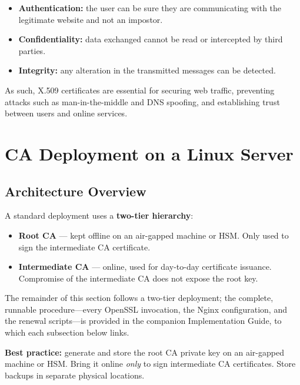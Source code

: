 \documentclass[10pt,twocolumn]{article}
\newcommand{\IGbase}{https://github.com/willLeckyThom/NetworkSecurity/blob/main/Projet/certificate_chain.md}
\newif\ifIGhref
\newcommand{\IGdoc}[1]{\ifIGhref\href{\IGbase}{#1}\else#1\fi}%
\begin{document}
\begin{itemize}
  \item \textbf{Authentication:} the user can be sure they are communicating
        with the legitimate website and not an impostor.
  \item \textbf{Confidentiality:} data exchanged cannot be read or intercepted
        by third parties.
  \item \textbf{Integrity:} any alteration in the transmitted messages can be
        detected.
\end{itemize}

As such, X.509 certificates are essential for securing web traffic, preventing
attacks such as man-in-the-middle and DNS spoofing, and establishing trust
between users and online services.

\section{CA Deployment on a Linux Server}

\subsection{Architecture Overview}

A standard deployment uses a \textbf{two-tier hierarchy}:

\begin{itemize}
  \item \textbf{Root CA} --- kept offline on an air-gapped machine or HSM.
        Only used to sign the intermediate CA certificate.
  \item \textbf{Intermediate CA} --- online, used for day-to-day certificate
        issuance. Compromise of the intermediate CA does not expose the
        root key.
\end{itemize}

The remainder of this section follows a two-tier deployment; the complete,
runnable procedure---every OpenSSL invocation, the Nginx configuration, and
the renewal scripts---is provided in the companion \IGdoc{Implementation
Guide}, to which each subsection below links.

\begin{infobox}
\footnotesize
\textbf{Best practice:} generate and store the root CA private key on an
air-gapped machine or HSM. Bring it online \emph{only} to sign intermediate
CA certificates. Store backups in separate physical locations.
\end{infobox}
\end{document}
